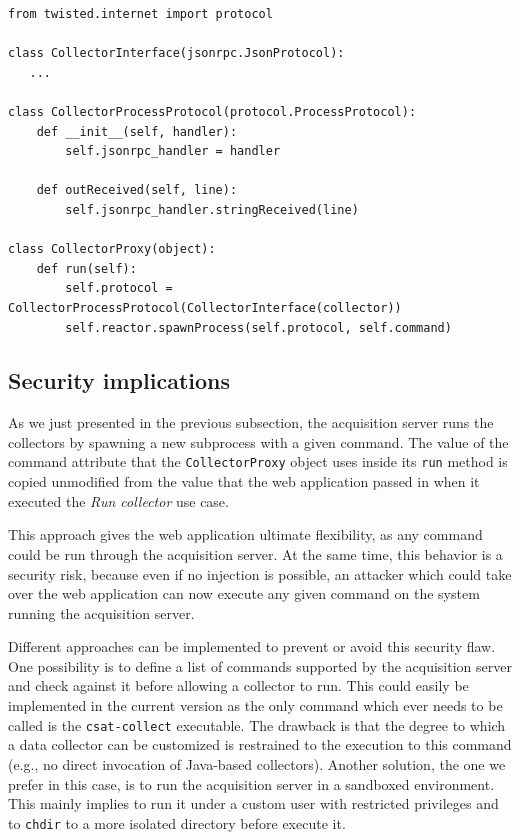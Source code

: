 \begin{lstlisting}[caption={Creation and publication of the collector interface.},label=lst:collector-interface]
from twisted.internet import protocol
  
class CollectorInterface(jsonrpc.JsonProtocol):
   ...

class CollectorProcessProtocol(protocol.ProcessProtocol):
    def __init__(self, handler):
        self.jsonrpc_handler = handler

    def outReceived(self, line):
        self.jsonrpc_handler.stringReceived(line)

class CollectorProxy(object):
    def run(self):
        self.protocol = CollectorProcessProtocol(CollectorInterface(collector))
        self.reactor.spawnProcess(self.protocol, self.command)
\end{lstlisting}


\subsection{Security implications}

As we just presented in the previous subsection, the acquisition server runs the collectors by spawning a new subprocess with a given command. The value of the command attribute that the \texttt{CollectorProxy} object uses inside its \texttt{run} method is copied unmodified from the value that the web application passed in when it executed the \emph{Run collector} use case.

This approach gives the web application ultimate flexibility, as any command could be run through the acquisition server. At the same time, this behavior is a security risk, because even if no injection is possible, an attacker which could take over the web application can now execute any given command on the system running the acquisition server.

Different approaches can be implemented to prevent or avoid this security flaw. One possibility is to define a list of commands supported by the acquisition server and check against it before allowing a collector to run. This could easily be implemented in the current version as the only command which ever needs to be called is the \texttt{csat-collect} executable. The drawback is that the degree to which a data collector can be customized is restrained to the execution to this command (e.g., no direct invocation of Java-based collectors). Another solution, the one we prefer in this case, is to run the acquisition server in a sandboxed environment. This mainly implies to run it under a custom user with restricted privileges and to \texttt{chdir} to a more isolated directory before execute it.


